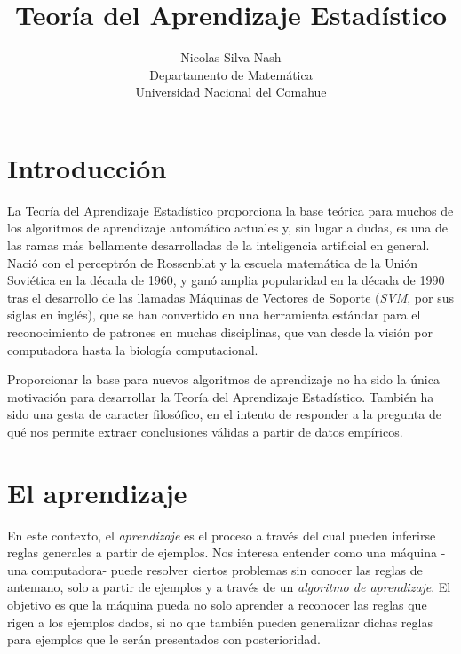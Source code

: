 \documentclass{article}
\begin{document}
\title{Teoría del Aprendizaje Estadístico}
\author{Nicolas Silva Nash \\ Departamento de Matemática \\ Universidad Nacional del Comahue}
\maketitle

\section{Introducción}
La Teoría del Aprendizaje Estadístico proporciona la base teórica para muchos de los algoritmos de aprendizaje automático actuales y,
sin lugar a dudas, es una de las ramas más bellamente desarrolladas de la inteligencia artificial en general. Nació con el perceptrón de Rossenblat
y la escuela matemática de la Unión Soviética en la década de 1960, y ganó amplia popularidad en la década de 1990 tras el desarrollo de las llamadas 
Máquinas de Vectores de Soporte (\textit{SVM}, por sus siglas en inglés), que se han convertido en una herramienta estándar para el reconocimiento de 
patrones en muchas disciplinas, que van desde la visión por computadora hasta la biología computacional.

Proporcionar la base para nuevos algoritmos de aprendizaje no ha sido la única motivación para desarrollar la Teoría del Aprendizaje 
Estadístico. También ha sido una gesta de caracter filosófico, en el intento de responder a la pregunta de qué nos permite extraer conclusiones válidas 
a partir de datos empíricos.  

\section{El aprendizaje}

En este contexto, el \textit{aprendizaje} es el proceso a través del cual pueden inferirse reglas generales a partir de ejemplos. Nos interesa 
entender como una máquina -una computadora- puede resolver ciertos problemas sin conocer las reglas de antemano, solo a partir de ejemplos y a través
de un \textit{algoritmo de aprendizaje}. El objetivo es que la máquina pueda no solo aprender a reconocer las reglas que rigen a los ejemplos dados,
si no que también pueden generalizar dichas reglas para ejemplos que le serán presentados con posterioridad.
\end{document}
